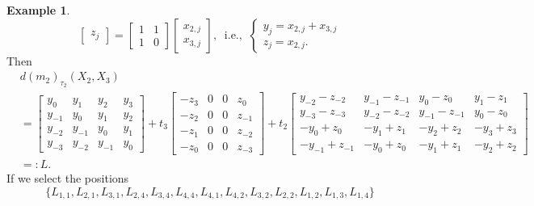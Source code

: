 \documentclass[reqno]{amsart}
\theoremstyle{definition}
\newtheorem{example}[theorem]{Example}
\numberwithin{equation}{section}
\begin{document}
\begin{example}
\begin{equation}
\begin{bmatrix}
            z_j
        \end{bmatrix}=\begin{bmatrix}
            1 & 1 \\
            1 & 0
        \end{bmatrix}\begin{bmatrix}
            x_{2,j}\\ x_{3,j}
        \end{bmatrix},~\text{ i.e., }~\begin{cases}
            y_j=x_{2,j}+x_{3,j}\\
            z_j=x_{2,j}.
        \end{cases}
    \end{equation}
    Then 
    \begin{equation*}
    \begin{aligned}
        &d(m_{2})_{\tau_2}(X_2,X_3)\\
        &=\begin{bmatrix}
            y_0 & y_1 & y_2 & y_3\\
            y_{-1} & y_0 & y_1 & y_2\\
            y_{-2} & y_{-1} & y_0 & y_1\\
            y_{-3} & y_{-2} & y_{-1} & y_0
        \end{bmatrix}+t_3\begin{bmatrix}
            -z_3 & 0 & 0 & z_0\\
            -z_2 & 0 & 0 & z_{-1}\\
            -z_1 & 0 & 0 & z_{-2}\\
            -z_0 & 0 & 0 & z_{-3}
        \end{bmatrix}+t_2\begin{bmatrix}
            y_{-2}-z_{-2} & y_{-1}-z_{-1} & y_{0}-z_{0} & y_{1}-z_{1}\\
            y_{-3}-z_{-3} & y_{-2}-z_{-2} & y_{-1}-z_{-1} & y_{0}-z_{0}\\
            -y_0+z_0 & -y_1+z_1 & -y_2+z_2 & -y_3+z_3\\
            -y_{-1}+z_{-1} & -y_0+z_0 & -y_1+z_1  & -y_2+z_2
        \end{bmatrix}\\
        &=:L.
    \end{aligned}
    \end{equation*}
    If we select the positions
    \begin{equation}\label{eq:picking Lij 1}
        \{L_{1,1}, L_{2,1}, L_{3,1}, L_{2,4}, L_{3,4}, L_{4,4}, L_{4,1}, L_{4,2}, L_{3,2}, L_{2,2}, L_{1,2}, L_{1,3}, L_{1,4}\}

\end{equation}
\end{example}
\end{document}
